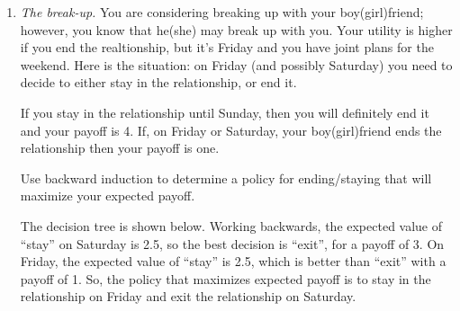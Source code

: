 \begin{enumerate}
\item \emph{The break-up.} You are considering
  breaking up with your boy(girl)friend; however, you know that
  he(she) may break up with you. Your utility is higher if you end
  the realtionship, but it's Friday and you have joint plans for the
  weekend. Here is the situation: on Friday (and possibly Saturday)
  you need to decide to either stay in the relationship, or end it.
If you stay in the relationship until Sunday, then you will definitely
end it and your payoff is 4. If, on Friday or Saturday, your boy(girl)friend
ends the relationship then your payoff is one.

Use backward induction to determine a policy for ending/staying that
will maximize your expected payoff.

\begin{solution}
  \bs The decision tree is shown below. Working backwards, the expected
  value of ``stay'' on Saturday is 2.5, so the best decision is ``exit'',
  for a payoff of 3. On Friday, the expected value of ``stay'' is 2.5,
  which is better than ``exit'' with a payoff of 1. So, the policy that
  maximizes expected payoff is to stay in the relationship on Friday and
  exit the relationship on Saturday.

\vspace{.2in}
\begin{center}
\end{center}
\end{solution}


\end{enumerate}
